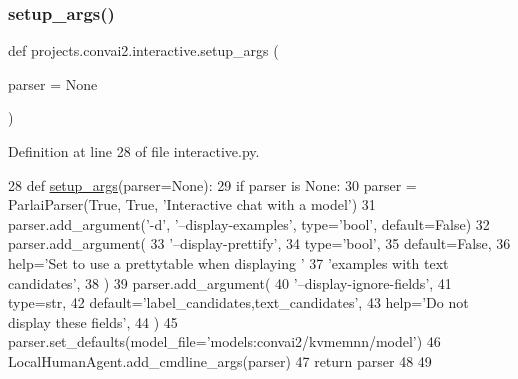 \mbox{\label{namespaceprojects_1_1convai2_1_1interactive_ac1ba8d400d87a3bb10e40d5ab1bcfd86}} 
\subsubsection{\texorpdfstring{setup\+\_\+args()}{setup\_args()}}
{\footnotesize\ttfamily def projects.\+convai2.\+interactive.\+setup\+\_\+args (\begin{DoxyParamCaption}\item[{}]{parser = {\ttfamily None} }\end{DoxyParamCaption})}



Definition at line 28 of file interactive.\+py.


\begin{DoxyCode}
28 \textcolor{keyword}{def }\hyperlink{namespaceprojects_1_1self__feeding_1_1interactive_a2ad3b874d9caef6e76ea41e029b933f0}{setup\_args}(parser=None):
29     \textcolor{keywordflow}{if} parser \textcolor{keywordflow}{is} \textcolor{keywordtype}{None}:
30         parser = ParlaiParser(\textcolor{keyword}{True}, \textcolor{keyword}{True}, \textcolor{stringliteral}{'Interactive chat with a model'})
31     parser.add\_argument(\textcolor{stringliteral}{'-d'}, \textcolor{stringliteral}{'--display-examples'}, type=\textcolor{stringliteral}{'bool'}, default=\textcolor{keyword}{False})
32     parser.add\_argument(
33         \textcolor{stringliteral}{'--display-prettify'},
34         type=\textcolor{stringliteral}{'bool'},
35         default=\textcolor{keyword}{False},
36         help=\textcolor{stringliteral}{'Set to use a prettytable when displaying '}
37         \textcolor{stringliteral}{'examples with text candidates'},
38     )
39     parser.add\_argument(
40         \textcolor{stringliteral}{'--display-ignore-fields'},
41         type=str,
42         default=\textcolor{stringliteral}{'label\_candidates,text\_candidates'},
43         help=\textcolor{stringliteral}{'Do not display these fields'},
44     )
45     parser.set\_defaults(model\_file=\textcolor{stringliteral}{'models:convai2/kvmemnn/model'})
46     LocalHumanAgent.add\_cmdline\_args(parser)
47     \textcolor{keywordflow}{return} parser
48 
49 
\end{DoxyCode}



